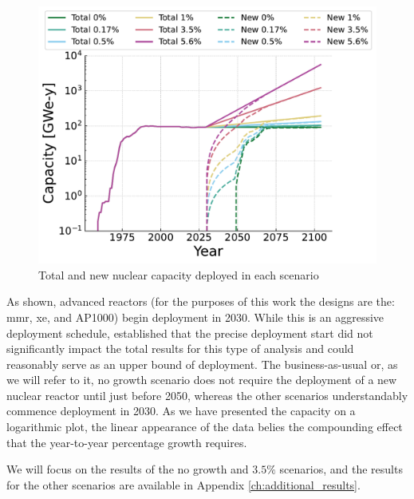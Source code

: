 \begin{figure}[H]
    \centering
    \includegraphics[scale=0.7]{images/results/deployment_calcs/total_new_capacity_scenarios.pdf}
    \caption{Total and new nuclear capacity deployed in each scenario}
    \label{fig:dep_goals}
\end{figure}

As shown, advanced reactors (for the purposes of this work the designs are the:
\gls{mmr}, \gls{xe}, and AP1000) begin deployment in 2030. While this is an
aggressive deployment schedule, \cite{bachmann_thesis_2023} established that
the precise deployment start did not significantly impact the total results for
this type of analysis and could reasonably serve as an upper bound of
deployment. The business-as-usual or, as we will refer to it, no growth
scenario does not require the deployment of a new nuclear reactor until just
before 2050, whereas the other scenarios understandably commence deployment in
2030. As we have presented the capacity on a logarithmic plot, the linear
appearance of the data belies the compounding effect that the year-to-year
percentage growth requires.

We will focus on the results of the no growth and $3.5\%$ scenarios, and the results for the other scenarios are available in Appendix \ref{ch:additional_results}.